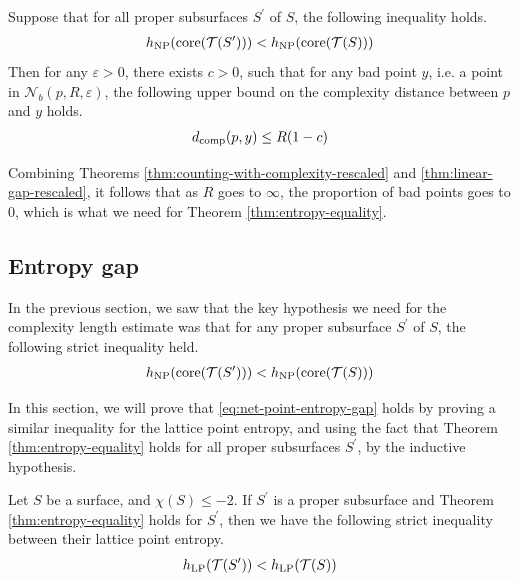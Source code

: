 \documentclass[12pt, reqno]{amsart}
\begin{document}
\begin{theorem}
  \label{thm:linear-gap-rescaled}
  Suppose that for all proper subsurfaces $S^{\prime}$ of $S$, the following inequality holds.
  \begin{align*}
    h_{\mathrm{NP}}(\mathrm{core}(\mathcal{T}(S^{\prime}))) < h_{\mathrm{NP}}(\mathrm{core}(\mathcal{T}(S)))
  \end{align*}
  Then for any $\varepsilon >0$, there exists $c > 0$, such that for any bad point $y$, i.e. a point in $\mathcal{N}_b(p, R, \varepsilon)$, the following upper bound on the complexity distance between $p$ and $y$ holds.
  \begin{align*}
    d_{\mathrm{comp}}(p, y) \leq R(1 - c)
  \end{align*}
\end{theorem}

Combining Theorems \ref{thm:counting-with-complexity-rescaled} and \ref{thm:linear-gap-rescaled}, it follows that as $R$ goes to $\infty$, the proportion of bad points goes to $0$, which is what we need for Theorem \ref{thm:entropy-equality}.

\subsection{Entropy gap}
\label{sec:entr-gap-cons}

In the previous section, we saw that the key hypothesis we need for the complexity length estimate was that for any proper subsurface $S^{\prime}$ of $S$, the following strict inequality held.
\begin{align}
  \label{eq:net-point-entropy-gap}
  h_{\mathrm{NP}}(\mathrm{core}(\mathcal{T}(S^{\prime}))) < h_{\mathrm{NP}}(\mathrm{core}(\mathcal{T}(S)))
\end{align}

In this section, we will prove that \eqref{eq:net-point-entropy-gap} holds by proving a similar inequality for the lattice point entropy, and using the fact that Theorem \ref{thm:entropy-equality} holds for all proper subsurfaces $S^{\prime}$, by the inductive hypothesis.

\begin{lemma}
  \label{lem:entropy-inequality}
  Let $S$ be a surface, and $\chi(S) \leq -2$. If $S^{\prime}$ is a proper subsurface and Theorem \ref{thm:entropy-equality} holds for $S^{\prime}$, then we have the following strict inequality between their lattice point entropy.
  \begin{align*}
    h_{\mathrm{LP}}(\mathcal{T}(S^{\prime})) < h_{\mathrm{LP}}(\mathcal{T}(S))
  \end{align*}
\end{lemma}
\end{document}
